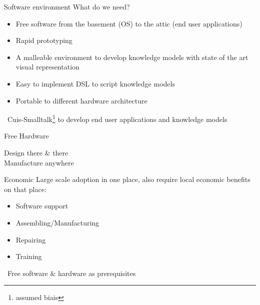 \documentclass{beamer}
\newcommand{\tip}{\boldmath{\textcolor{red}{$\Rightarrow$}}}
\begin{document}
\begin{frame}{Software environment}
  What do we need?

  \vspace{10pt}
  
  \begin{itemize}
  \item Free software from the basement (OS) to the attic (end user
    applications)
  \item Rapid prototyping
  \item A malleable environment to develop knowledge models with state
    of the art visual representation
  \item Easy to implement DSL to script knowledge models
  \item Portable to different hardware architecture
  \end{itemize}

  \vspace*{10pt}

  \tip\ Cuis-Smalltalk\footnote[frame]{assumed biais} to develop end user applications and knowledge
  models
\end{frame}
%
\begin{frame}{Free Hardware}
  \fontsize{14pt}{8pt}\selectfont
  \begin{center}
    Design there \& there\\
    \vspace*{10pt}
    Manufacture anywhere
  \end{center}
\end{frame}

\begin{frame}{Economic}
  Large scale adoption in one place, also require local economic
  benefits on that place:
  \begin{itemize}
  \item Software support
  \item Assembling/Manufacturing
  \item Repairing
  \item Training
  \end{itemize}

  \vspace*{10pt}
  
  \tip\ Free software \& hardware as prerequisites
  
\end{frame}
\end{document}
